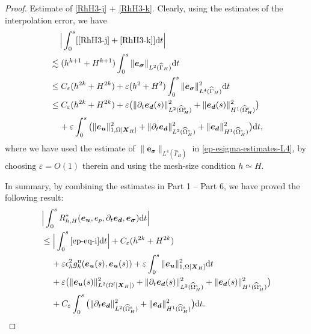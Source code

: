 \documentclass[11pt,reqno]{amsart}
\theoremstyle{definition}
\theoremstyle{plain}
\numberwithin{theorem}{section}
\numberwithin{proposition}{section}
\numberwithin{lemma}{section}
\numberwithin{equation}{section}
\newcommand{\bs}[1]{\boldsymbol{#1}}
\newcommand{\dep}{{{\bs{d}}}}
\def\d{\mathrm{d}}
\renewcommand{\(}{\bigl(}
\renewcommand{\)}{\bigr)}
\begin{document}
\begin{proof}
 Estimate of \eqref{RhH3-j} + \eqref{RhH3-k}. Clearly, using the estimates of the interpolation error, we have 
\begin{align}
&\quad\, \Big|\int_0^s [\eqref{RhH3-j} + \eqref{RhH3-k}] \d t \Big| \notag\\
&\lesssim (h^{k+1} +H^{k+1}) \int_0^s \|{\bs e}_{\bs\sigma}\|_{L^2(\widehat\Gamma_H)} \d t \notag\\
&\le C_\varepsilon (h^{2k} +H^{2k})
+\varepsilon (h^2+H^2) \int_0^s \|{\bs e}_{\bs\sigma}\|_{L^4(\widehat\Gamma_H)}^2 \d t \notag\\
&\le C_\varepsilon (h^{2k} +H^{2k}) 
+ \varepsilon \big(\|\partial_t{\bs e}_\dep(s)\|_{L^2(\widehat{\Omega}^{\rm s}_H)}^2 + \|{\bs e}_\dep(s)\|_{H^1(\widehat{\Omega}^{\rm s}_H)}^2 \big) \notag\\
&\quad\, + \varepsilon \int_0^s \big(\| {\bs e}_{\bs u} \|_{1,\Omega[{\bs X}_H]}^2 + \|\partial_t{\bs e}_\dep\|_{L^2(\widehat{\Omega}^{\rm s}_H)}^2 + \|{\bs e}_\dep\|_{H^1(\widehat{\Omega}^{\rm s}_H)}^2 \big) \d t ,
\end{align}
where we have used the estimate of $\| {\bs e}_{\bs\sigma} \|_{L^4(\widehat\Gamma_H)}$ in \eqref{ep-esigma-estimates-L4}, by choosing $\varepsilon=O(1)$ therein and using the mesh-size condition $h\simeq H$.

In summary, by combining the estimates in Part 1 -- Part 6, we have proved the following result:
\begin{align}\label{R-estimate-1}
&\Big| \int_0^s R_{h,H}^*({\bs e}_{\bs u}, e_p, \partial_t{\bs e}_{\bs d}, {\bs e}_{{\bs \sigma} }) \d t\Big| \notag\\
&\le \Big| \int_0^s \eqref{ep-eq-i} \d t\Big| 
+ C_\varepsilon(h^{2k} +H^{2k}) \notag\\
&\quad\,
+ \varepsilon \epsilon_h^2 g^{\rm u}_h({\bs e}_{\bs u}(s),{\bs e}_{\bs u}(s)) + \varepsilon \int_0^s \| {\bs e}_{\bs u} \|_{1,\Omega[{\bs X}_H]}^2 \d t 
\notag\\ 
&\quad\, 
+ \varepsilon \big(\|{\bs e}_{\bs u}(s)\|_{L^2(\Omega^{\rm f}[\bs X_H])}^2 + \|\partial_t{\bs e}_\dep(s)\|_{L^2(\widehat{\Omega}^{\rm s}_H)}^2 + \|{\bs e}_\dep(s)\|_{H^1(\widehat{\Omega}^{\rm s}_H)}^2 \big) \notag\\ 
&\quad\, 
+ C_\varepsilon \int_0^s \big( \|\partial_t{\bs e}_\dep\|_{L^2(\widehat{\Omega}^{\rm s}_H)}^2 + \|{\bs e}_\dep\|_{H^1(\widehat{\Omega}^{\rm s}_H)}^2 \big) \d t  .
\end{align}



\end{proof}
\end{document}
